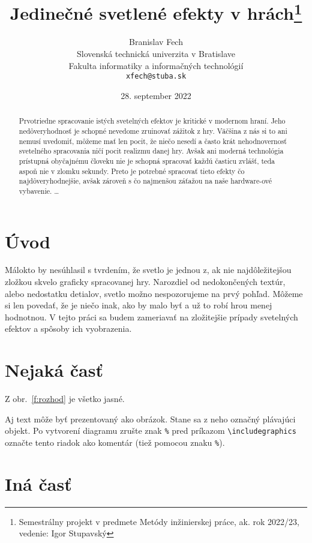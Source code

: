 \documentclass[10pt,twoside,slovak,a4paper]{article}
\title{Jedinečné svetlené efekty v hrách\thanks{Semestrálny projekt v predmete Metódy inžinierskej práce, ak. rok 2022/23, vedenie: Igor Stupavský}} %
\author{Branislav Fech\\[2pt]
	{\small Slovenská technická univerzita v Bratislave}\\
	{\small Fakulta informatiky a informačných technológií}\\
	{\small \texttt{xfech@stuba.sk}}
	}
\date{\small 28. september 2022} %
\begin{document}
\maketitle

\begin{abstract}
Prvotriedne spracovanie istých svetelných efektov je kritické v modernom hraní. 
Jeho nedôveryhodnosť je schopné nevedome zruinovať zážitok z hry. Väčšina z nás 
si to ani nemusí uvedomiť, môžeme mať len pocit, že niečo nesedí a často krát 
nehodnovernosť svetelného spracovania ničí pocit realizmu danej hry. Avšak ani 
moderná technológia prístupná obyčajnému človeku nie je schopná spracovať každú 
časticu zvlášť, teda aspoň nie v zlomku sekundy. Preto je potrebné spracovať tieto 
efekty čo najdôveryhodnejšie, avšak zároveň s čo najmenšou záťažou na naše hardware-ové 
vybavenie.
\ldots
\end{abstract}



\section{Úvod}
Málokto by nesúhlasil s tvrdením, že svetlo je jednou z, ak nie najdôležitejšou 
zložkou skvelo graficky spracovanej hry. Narozdiel od nedokončených textúr, alebo 
nedostatku detialov, svetlo možno nespozorujeme na prvý pohľad. Môžeme si len povedať, 
že je niečo inak, ako by malo byť a už to robí hrou menej hodnotnou. V tejto práci sa 
budem zameriavať na zložitejšie prípady svetelných efektov a spôsoby ich vyobrazenia.

\section{Nejaká časť} \label{nejaka}

Z obr.~\ref{f:rozhod} je všetko jasné. 

\begin{figure*}[tbh]
\centering
Aj text môže byť prezentovaný ako obrázok. Stane sa z neho označný plávajúci objekt. Po vytvorení diagramu zrušte znak \texttt{\%} pred príkazom \verb|\includegraphics| označte tento riadok ako komentár (tiež pomocou znaku \texttt{\%}).
\caption{Rozhodujúci argument.}
\label{f:rozhod}
\end{figure*}



\section{Iná časť} \label{ina}
\end{document}
